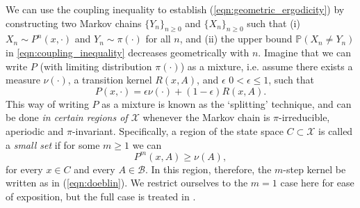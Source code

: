 \documentclass{article}
\newcommand{\X}{\mathcal{X}}
\newcommand{\B}{\mathcal{B}}
\begin{document}
We can use the coupling inequality to establish (\ref{eqn:geometric_ergodicity}) by constructing two Markov chains $\{Y_n\}_{n \geq 0}$ and $\{ X_n\}_{n \geq 0}$ such that (i) $X_n \sim P^n(x,\cdot)$ and $Y_n \sim \pi(\cdot)$ for all $n$, and (ii) the upper bound $\mathbb{P}(X_n \neq Y_n)$ in \eqref{eqn:coupling_inequality} decreases geometrically with $n$. 
Imagine that we can write $P$ (with limiting distribution $\pi(\cdot)$) as a mixture, i.e. assume there exists a measure $\nu(\cdot)$, a transition kernel $R(x,A)$, and  $\epsilon$  $0<\epsilon\leq1$, such that
\begin{equation} \label{eqn:doeblin}
P(x,\cdot) = \epsilon \nu(\cdot) + (1 - \epsilon)R(x,A).
\end{equation}
This way of writing $P$ as a mixture is known as the `splitting' technique, and can be done \emph{in certain regions of $\X$} whenever the Markov chain is $\pi$-irreducible, aperiodic and $\pi$-invariant.  Specifically, a region of the state space $C \subset \X$ is called a \emph{small set} if for some $m \geq 1$ we can
\[
P^m(x,A) \geq \nu(A),
\]
for every $x \in C$ and every $A \in \B$.  In this region, therefore, the $m$-step kernel be written as in (\ref{eqn:doeblin}).  We restrict ourselves to the $m=1$ case here for ease of exposition, but the full case is treated in \cite{roberts2004general}.
\end{document}
